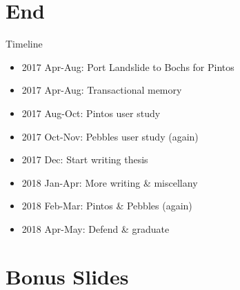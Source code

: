 \documentclass[xcolor=dvipsnames]{beamer}
\begin{document}

\section{End}

\begin{frame}{Timeline}
	\begin{itemize}
		\item 2017 Apr-Aug: Port Landslide to Bochs for Pintos
		\item 2017 Apr-Aug: Transactional memory
		\item 2017 Aug-Oct: Pintos user study
		\item 2017 Oct-Nov: Pebbles user study (again)
		\item 2017 Dec:     Start writing thesis
		\item 2018 Jan-Apr: More writing \& miscellany
		\item 2018 Feb-Mar: Pintos \& Pebbles (again)
		\item 2018 Apr-May: Defend \& graduate
	\end{itemize}
\end{frame}



\section{Bonus Slides}

\end{document}
